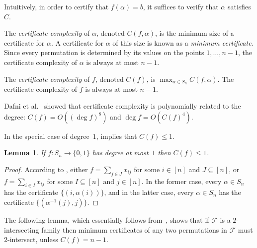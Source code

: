 \documentclass{article}
\newtheorem{lemma}[theorem]{Lemma}
\theoremstyle{definition}
\begin{document}
Intuitively, in order to certify that $f(\alpha) = b$, it suffices to verify that $\alpha$ satisfies $C$. 

The \emph{certificate complexity} of $\alpha$, denoted $C(f,\alpha)$, is the minimum size of a certificate for $\alpha$. A certificate for $\alpha$ of this size is known as a \emph{minimum certificate}.
Since every permutation is determined by its values on the points $1,\ldots,n-1$, the certificate complexity of $\alpha$ is always at most $n-1$.

The \emph{certificate complexity} of $f$, denoted $C(f)$, is $\max_{\alpha \in S_n} C(f,\alpha)$. The certificate complexity of $f$ is always at most $n-1$.

Dafni et al.~\cite[Theorem 3.1]{DFLLV} showed that certificate complexity is polynomially related to the degree: $C(f) = O((\deg f)^8)$ and $\deg f = O(C(f)^4)$.

In the special case of degree~$1$,  implies that $C(f) \leq 1$.

\begin{lemma} \label{lem:degree1-cert-sym}
If $f\colon S_n \to \{0,1\}$ has degree at most~$1$ then $C(f) \leq 1$.
\end{lemma}
\begin{proof}
According to , either $f = \sum_{j \in J} x_{ij}$ for some $i \in [n]$ and $J \subseteq [n]$, or $f = \sum_{i \in I} x_{ij}$ for some $I \subseteq [n]$ and $j \in [n]$. In the former case, every $\alpha \in S_n$ has the certificate $\{(i,\alpha(i))\}$, and in the latter case, every $\alpha \in S_n$ has the certificate $\{(\alpha^{-1}(j),j)\}$.
\end{proof}

\medskip

The following lemma, which essentially follows from~\cite[Lemma 7.3]{DFLLV}, shows that if $\mathcal{F}$ is a $2$-intersecting family then minimum certificates of any two permutations in $\mathcal{F}$ must $2$-intersect, unless $C(f) = n-1$.
\end{document}
